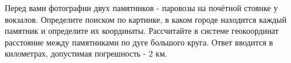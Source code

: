 

Перед вами фотографии двух памятников - паровозы на почётной стоянке у вокзалов. Определите поиском по картинке, в каком городе находится каждый памятник и определите их координаты. Рассчитайте в системе геокоординат расстояние между памятниками по дуге большого круга. Ответ вводится в километрах, допустимая погрешность - 2 км.

